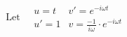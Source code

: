 \documentclass[preview]{standalone}
\begin{document}
\begin{align*}
\textrm{Let} \quad \begin{array}{rl}u=t & v'=e^{-i\omega t} \\ u'=1 & v=\frac{-1}{i\omega}\cdot e^{-i\omega t} \end{array} \\ \\
\end{align*}
\end{document}

